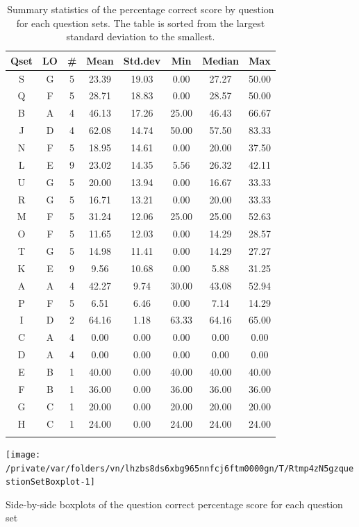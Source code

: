 \documentclass[12pt,english,nohyper]{tufte-handout}\usepackage[]{graphicx}\usepackage[]{color}
\newenvironment{knitrout}{}{} %
\begin{document}
\begin{longtable}{cc|ccc|ccc}
  \hline
Qset & LO & \# & Mean & Std.dev & Min & Median & Max \\ 
  \hline
S & G &   5 & 23.39 & 19.03 & 0.00 & 27.27 & 50.00 \\ 
  Q & F &   5 & 28.71 & 18.83 & 0.00 & 28.57 & 50.00 \\ 
  B & A &   4 & 46.13 & 17.26 & 25.00 & 46.43 & 66.67 \\ 
  J & D &   4 & 62.08 & 14.74 & 50.00 & 57.50 & 83.33 \\ 
  N & F &   5 & 18.95 & 14.61 & 0.00 & 20.00 & 37.50 \\ 
  L & E &   9 & 23.02 & 14.35 & 5.56 & 26.32 & 42.11 \\ 
  U & G &   5 & 20.00 & 13.94 & 0.00 & 16.67 & 33.33 \\ 
  R & G &   5 & 16.71 & 13.21 & 0.00 & 20.00 & 33.33 \\ 
  M & F &   5 & 31.24 & 12.06 & 25.00 & 25.00 & 52.63 \\ 
  O & F &   5 & 11.65 & 12.03 & 0.00 & 14.29 & 28.57 \\ 
  T & G &   5 & 14.98 & 11.41 & 0.00 & 14.29 & 27.27 \\ 
  K & E &   9 & 9.56 & 10.68 & 0.00 & 5.88 & 31.25 \\ 
  A & A &   4 & 42.27 & 9.74 & 30.00 & 43.08 & 52.94 \\ 
  P & F &   5 & 6.51 & 6.46 & 0.00 & 7.14 & 14.29 \\ 
  I & D &   2 & 64.16 & 1.18 & 63.33 & 64.16 & 65.00 \\ 
  C & A &   4 & 0.00 & 0.00 & 0.00 & 0.00 & 0.00 \\ 
  D & A &   4 & 0.00 & 0.00 & 0.00 & 0.00 & 0.00 \\ 
  E & B &   1 & 40.00 & 0.00 & 40.00 & 40.00 & 40.00 \\ 
  F & B &   1 & 36.00 & 0.00 & 36.00 & 36.00 & 36.00 \\ 
  G & C &   1 & 20.00 & 0.00 & 20.00 & 20.00 & 20.00 \\ 
  H & C &   1 & 24.00 & 0.00 & 24.00 & 24.00 & 24.00 \\ 
   \hline
\hline
\caption{Summary statistics of the percentage correct score by question for each question sets. The table is sorted from the largest standard deviation to the smallest.} 
\label{tab:QuestionSet_summary}
\end{longtable}


\begin{knitrout}
\color{fgcolor}\begin{marginfigure}

{\centering \texttt{[image: /private/var/folders/vn/lhzbs8ds6xbg965nnfcj6ftm0000gn/T/Rtmp4zN5gzquestionSetBoxplot-1]} 

}

\caption[Side-by-side boxplots of the question correct percentage score for each question set]{Side-by-side boxplots of the question correct percentage score for each question set}\label{fig:questionSetBoxplot}
\end{marginfigure}


\end{knitrout}
\end{document}
